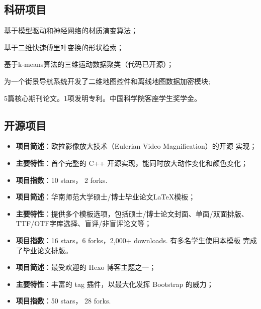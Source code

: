 \documentclass[11pt,a4paper,nolmodern]{moderncv}
\begin{document}
\subsection{\hei 科研项目}

{
  \begin{tightitemize}%
  \item 基于模型驱动和神经网络的材质演变算法；
  \item 基于二维快速傅里叶变换的形状检索；
  \item 基于k-means算法的三维运动数据聚类（代码已开源）；
  \item 为一个街景导航系统开发了二维地图控件和离线地图数据加密模块;
  \item 5篇核心期刊论文。1项发明专利。中国科学院客座学生奖学金。
 \end{tightitemize}}

\subsection{\hei 开源项目}

%
  {
\begin{itemize}
\item \textbf{项目简述}：欧拉影像放大技术（Eulerian Video Magnification）的开源
  实现；
\item \textbf{主要特性}：首个完整的 C++ 开源实现，能同时放大动作变化和颜色变化；
\item \textbf{项目指数}：10 stars， 2 forks.
\end{itemize}}

%
  {
\begin{itemize}
\item \textbf{项目简述}：华南师范大学硕士/博士毕业论文LaTeX模板；
\item \textbf{主要特性}：提供多个模板选项，包括硕士/博士论文封面、单面/双面排版、
  TTF/OTF字库选择、盲评/非盲评论文等；
\item \textbf{项目指数}：16 stars，6 forks，2,000+ downloads. 有多名学生使用本模板
  完成了毕业论文排版。
\end{itemize}}

%
  {
\begin{itemize}
\item \textbf{项目简述}：最受欢迎的 Hexo 博客主题之一；
\item \textbf{主要特性}：丰富的 tag 插件，以最大化发挥 Bootstrap 的威力；
\item \textbf{项目指数}：50 stars， 28 forks.
\end{itemize}}
\end{document}
